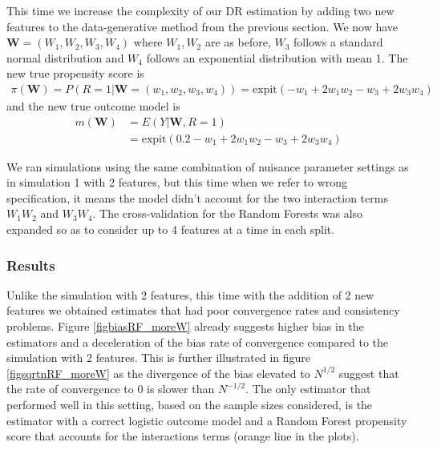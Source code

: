\documentclass[12pt,twoside]{article}
\newcommand{\expit}{\text{expit}}
\begin{document}
This time we increase the complexity of our DR estimation by adding two new features to the data-generative method from the previous section. We now have $\mathbf{W} = (W_1,W_2,W_3,W_4)$ where $W_1,W_2$ are as before, $W_3$ follows a standard normal distribution and $W_4$ follows an exponential distribution with mean 1. The new true propensity score is 
\begin{align*}
    \pi(\mathbf{W}) = P(R = 1 |\mathbf{W} = (w_1,w_2, w_3,w_4)) = \expit(-w_1 + 2w_1w_2 - w_3 + 2w_3w_4)
\end{align*}
and the new true outcome model is 
\begin{align*}
    m(\mathbf{W}) &= E(Y|\mathbf{W}, R=1) \\
    & = \expit(0.2 - w_1 + 2w_1w_2 - w_3 + 2w_3w_4)
\end{align*}

We ran simulations using the same combination of nuisance parameter settings as in simulation 1 with 2 features, but this time when we refer to wrong specification, it means the model didn't account for the two interaction terms $W_1W_2$ and $W_3W_4$. The cross-validation for the Random Forests was also expanded so as to consider up to 4 features at a time in each split. 

\subsubsection*{Results}

Unlike the simulation with 2 features, this time with the addition of 2 new features we obtained estimates that had poor convergence rates and consistency problems. Figure \ref{figbiasRF_moreW} already suggests higher bias in the estimators and a deceleration of the bias rate of convergence compared to the simulation with 2 features. This is further illustrated in figure \ref{figsqrtnRF_moreW} as the divergence of the bias elevated to $N^{1/2}$ suggest that the rate of convergence to 0 is slower than $N^{-1/2}$. The only estimator that performed well in this setting, based on the sample sizes considered, is the estimator with a correct logistic outcome model and a Random Forest propensity score that accounts for the interactions terms (orange line in the plots). 
\end{document}
